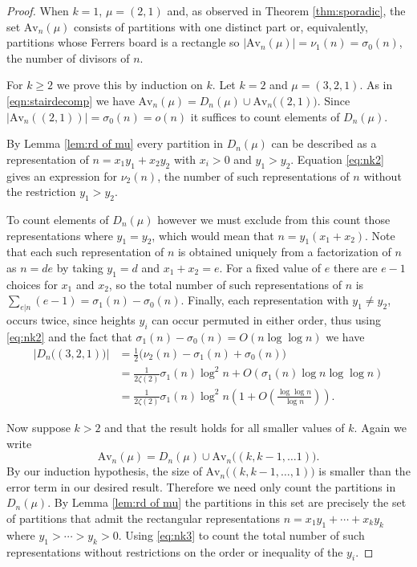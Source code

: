 \documentclass{article}
\theoremstyle{plain}
\theoremstyle{definition}
\newcommand{\Av}{\text{Av}}
\begin{document}
\begin{proof}
When $k=1$, $\mu = (2,1)$ and, as observed in Theorem \ref{thm:sporadic}, the set $\Av_n(\mu)$ consists of partitions with one distinct part or, equivalently, partitions whose Ferrers board is a rectangle so $|\Av_n(\mu)|=\nu_1(n)=\sigma_0(n)$, the number of divisors of $n$.


For $k\geq 2$ we prove this by induction on $k$.  Let $k=2$ and $\mu=(3,2,1)$. As in \eqref{eqn:stairdecomp} we have ${\Av_n(\mu)=D_n(\mu) \cup \Av_n\big((2,1)\big)}$. Since $|\Av_n((2,1))|=\sigma_0(n)=o(n)$ it suffices to count elements of  $D_n(\mu)$.   


By Lemma \ref{lem:rd of mu} every partition in $D_n(\mu)$ can be described as a representation of $n=x_1y_1+x_2y_2$ with $x_i>0$ and $y_1>y_2$. Equation \eqref{eq:nk2} gives an expression for $\nu_2(n)$, the number of such representations of $n$ without the restriction $y_1>y_2$. 

To count elements of $D_n(\mu)$ however we must exclude from this count those representations where $y_1=y_2$, which would mean that $n=y_1(x_1+x_2)$.  Note that each such representation of $n$ is obtained uniquely from a factorization of $n$ as $n=de$ by taking $y_1=d$ and $x_1+x_2=e$.   For a fixed value of $e$ there are $e-1$ choices for $x_1$ and $x_2$, so the total number of such representations of $n$ is $\displaystyle{\sum_{e|n} (e-1)} = \sigma_1(n)-\sigma_0(n)$.  Finally, each representation with $y_1 \neq y_2$, occurs twice, since heights $y_i$ can occur permuted in either order, thus using \eqref{eq:nk2} and the fact that $\sigma_1(n) - \sigma_0(n) = O(n\log\log n)$ we have
\begin{align*}
\left|D_n\big((3,2,1)\big)\right| &= \tfrac{1}{2}\big(\nu_2(n)-\sigma_1(n)+\sigma_0(n)\big)\\
&= \frac{1}{2\zeta(2)}\sigma_1(n)\log^2 n + O\left(\sigma_1(n)\log n \log \log n \right)\\
&= \frac{1}{2\zeta(2)}\sigma_1(n)\log^2 n \left(1+O\left(\frac{\log \log n}{\log n}\right)\right). \nonumber
\end{align*}


Now suppose $k>2$ and that the result holds for all smaller values of $k$.  Again we write
$$\Av_n(\mu) = D_n(\mu) \cup \Av_n\big((k,k-1,\ldots 1)\big).$$
By our induction hypothesis, the size of $\Av_n\big((k,k-1,\ldots, 1)\big)$ is smaller than the error term in our desired result.  Therefore we need only count the partitions in $D_n(\mu)$.  By Lemma \ref{lem:rd of mu} the partitions in this set are precisely the set of partitions that admit the rectangular representations $n=x_1y_1+ \cdots + x_ky_k$ where $y_1> \cdots >y_k>0$.   Using \eqref{eq:nk3} to count the total number of such representations without restrictions on the order or inequality of the $y_i$.  


\end{proof}
\end{document}
